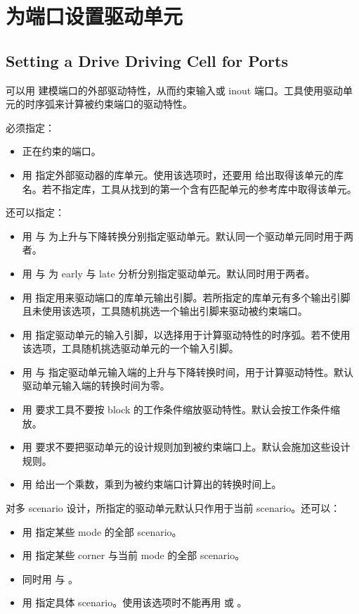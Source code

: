 \section{为端口设置驱动单元}
\subsection*{Setting a Drive Driving Cell for Ports}

可以用  建模端口的外部驱动特性，从而约束输入或 inout 端口。工具使用驱动单元的时序弧来计算被约束端口的驱动特性。

必须指定：
\begin{itemize}
  \item 正在约束的端口。
  \item 用  指定外部驱动器的库单元。使用该选项时，还要用  给出取得该单元的库名。若不指定库，工具从找到的第一个含有匹配单元的参考库中取得该单元。
\end{itemize}

还可以指定：
\begin{itemize}
  \item 用  与  为上升与下降转换分别指定驱动单元。默认同一个驱动单元同时用于两者。
  \item 用  与  为 early 与 late 分析分别指定驱动单元。默认同时用于两者。
  \item 用  指定用来驱动端口的库单元输出引脚。若所指定的库单元有多个输出引脚且未使用该选项，工具随机挑选一个输出引脚来驱动被约束端口。
  \item 用  指定驱动单元的输入引脚，以选择用于计算驱动特性的时序弧。若不使用该选项，工具随机挑选驱动单元的一个输入引脚。
  \item 用  与  指定驱动单元输入端的上升与下降转换时间，用于计算驱动特性。默认驱动单元输入端的转换时间为零。
  \item 用  要求工具不要按 block 的工作条件缩放驱动特性。默认会按工作条件缩放。
  \item 用  要求不要把驱动单元的设计规则加到被约束端口上。默认会施加这些设计规则。
  \item 用  给出一个乘数，乘到为被约束端口计算出的转换时间上。
\end{itemize}

对多 scenario 设计，所指定的驱动单元默认只作用于当前 scenario。还可以：
\begin{itemize}
  \item 用  指定某些 mode 的全部 scenario。
  \item 用  指定某些 corner 与当前 mode 的全部 scenario。
  \item 同时用  与 。
  \item 用  指定具体 scenario。使用该选项时不能再用  或 。
\end{itemize}

